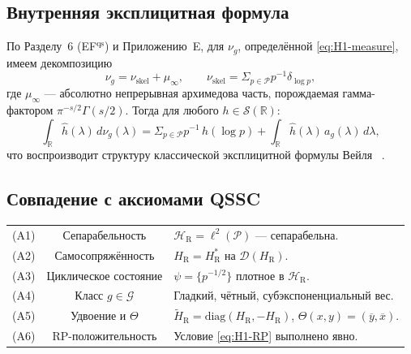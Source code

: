 \documentclass{article}
\numberwithin{equation}{section}
\theoremstyle{plain}
\theoremstyle{definition}
\theoremstyle{remark}
\def\delta{δ}\def\Delta{Δ}\def\epsilon{ε}\def\zeta{ζ}%
\def\infty{∞}\def\partial{∂}\def\sum{Σ}\def\int{∫}%
\begin{document}
\subsection*{Внутренняя эксплицитная формула}

По Разделу~6 (EF$^{\mathrm{qs}}$) и Приложению~E, для \(\nu_g\), определённой \eqref{eq:H1-measure},
имеем декомпозицию
\begin{equation}\label{eq:H1-EF}
\nu_g=\nu_{\mathrm{skel}}+\mu_\infty,
\qquad
\nu_{\mathrm{skel}}=\sum_{p\in\mathcal P} p^{-1}\delta_{\log p},
\end{equation}
где \(\mu_\infty\) — абсолютно непрерывная архимедова часть,  
порождаемая гамма-фактором \(\pi^{-s/2}\Gamma(s/2)\).
Тогда для любого \(h\in\mathcal S(\mathbb R)\):
\begin{equation}\label{eq:H1-EF-func}
\int_{\mathbb R}\widehat h(\lambda)\,d\nu_g(\lambda)
=\sum_{p\in\mathcal P} p^{-1}\,\widehat h(\log p)
+\int_{\mathbb R}\widehat h(\lambda)\,a_g(\lambda)\,d\lambda,
\end{equation}
что воспроизводит структуру классической эксплицитной формулы Вейля ~\cite{Weil1952, Connes1999}.

\subsection*{Совпадение с аксиомами QSSC}

\begin{center}
\renewcommand{\arraystretch}{1.2}
\begin{tabular}{lcl}
(A1) & Сепарабельность & $\mathcal H_{\mathrm R}=\ell^2(\mathcal P)$ — сепарабельна.\\
(A2) & Самосопряжённость & $H_{\mathrm R}=H_{\mathrm R}^\ast$ на $\mathcal D(H_{\mathrm R})$.\\
(A3) & Циклическое состояние & $\psi=\{p^{-1/2}\}$ плотное в $\mathcal H_{\mathrm R}$.\\
(A4) & Класс $g\in\mathcal G$ & Гладкий, чётный, субэкспоненциальный вес.\\
(A5) & Удвоение и $\Theta$ & $\widetilde H_{\mathrm R}=\mathrm{diag}(H_{\mathrm R},-H_{\mathrm R})$, $\Theta(x,y)=(\overline{y},\overline{x})$.\\
(A6) & RP-положительность & Условие \eqref{eq:H1-RP} выполнено явно.\\
\end{tabular}
\end{center}

\end{document}
